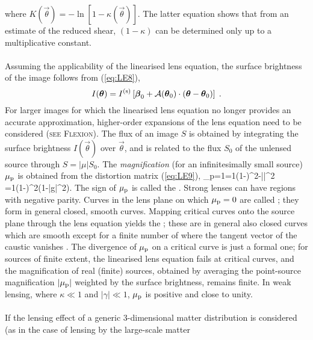 {\begin{equation}
\label{eq:LE18}
\end{equation}
where $K(\vec\theta)=-\ln[1-\kappa(\vec\theta)]$. The latter
equation shows that from an estimate of the reduced shear, $(1-\kappa)$
can be determined only up to a multiplicative constant.
\\
\\
Assuming the applicability of the linearised lens equation,
the surface brightness of the image follows from (\ref{eq:LE8}),
%
\begin{equation}
  I(\vec\theta) = I^{(\rm s)}\left[
    \vec\beta_0+\mathcal{A}(\vec\theta_0)
    \cdot(\vec\theta-\vec\theta_0)
  \right]\;.
\label{eq:LE19}
\end{equation}
%
For larger images for which the linearised lens equation no longer
provides an accurate approximation, higher-order expansions of the
lens equation need to be considered ({\scshape{\footnotesize see}
  \gls{Flexion}}). The flux of an image $S$ is obtained by integrating the
surface brightness $I(\vec\theta)$ over $\vec\theta$, and is related
to the flux $S_0$ of the unlensed source through $S=|\mu|S_0$. The
{\it magnification} (for an infinitesimally small
source) $\mu_{\rm p}$ is 
obtained from the distortion matrix 
(\ref{eq:LE9}), 
%
\be
\mu_{\rm p}={1\over {}}={1\over (1-\kappa)^2-|\gamma|^2}
={1\over (1-\kappa)^2(1-|g|^2)}\;.
\label{eq:LE20}
\ee
%
The sign of $\mu_{\rm p}$ is called the . Strong lenses can have regions with
negative parity. Curves in the lens plane on which $\mu_{\rm p}=0$ are
called ; they form in
general closed, smooth curves. Mapping critical curves onto the source
plane through the lens equation yields the ; these are in general also closed curves which are smooth
except for a finite number of  where the
tangent vector of the caustic vanishes . The divergence of $\mu_{\rm
p}$ on a critical curve is just a formal one; for sources of finite
extent, the linearised lens equation fails at critical curves, and the
magnification of real (finite) sources, obtained by averaging the
point-source magnification $|\mu_{\rm p}|$ weighted by the surface
brightness, remains finite. In weak lensing, where $\kappa\ll 1$ and
$|\gamma|\ll 1$, $\mu_{\rm p}$ is positive and close to unity.
\\
\\
If the lensing effect of a generic 3-dimensional matter distribution is
considered (as in the case of lensing by the large-scale matter
}

